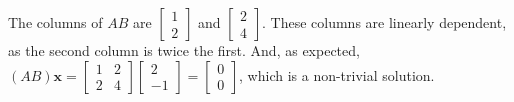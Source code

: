 \documentclass{article}
\begin{document}
                    The columns of $AB$ are $\begin{bmatrix} 1 \\ 2 \end{bmatrix}$ and $\begin{bmatrix} 2 \\ 4 \end{bmatrix}$. These columns are linearly dependent, as the second column is twice the first.
                    And, as expected, $(AB)\mathbf{x} = \begin{bmatrix} 1 & 2 \\ 2 & 4 \end{bmatrix} \begin{bmatrix} 2 \\ -1 \end{bmatrix} = \begin{bmatrix} 0 \\ 0 \end{bmatrix}$, which is a non-trivial solution.
\end{document}
